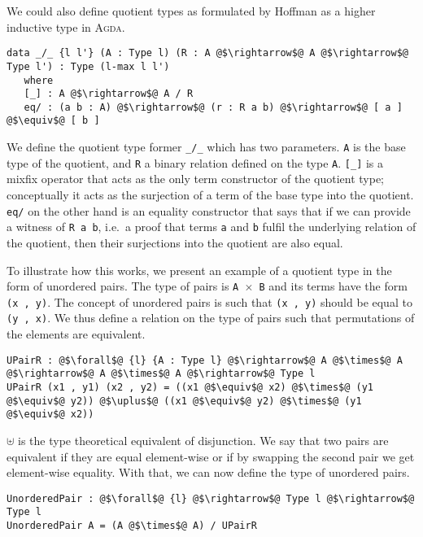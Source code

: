 \documentclass[12pt,twoside,maitrise]{dms}
\theoremstyle{definition}
\numberwithin{equation}{section}
\numberwithin{table}{chapter}
\numberwithin{figure}{chapter}
\newcommand\id[1] {\texttt{#1}}
\newcommand\fn[1] {\texttt{#1}}
\def\Agda{\textsc{Agda}\xspace}
\begin{document}
We could also define quotient types as formulated by
Hoffman\cite{hofmann1995extensional} as a higher inductive type in \Agda{}.

\begin{verbatim}
data _/_ {l l'} (A : Type l) (R : A @$\rightarrow$@ A @$\rightarrow$@ Type l') : Type (l-max l l')
   where
   [_] : A @$\rightarrow$@ A / R
   eq/ : (a b : A) @$\rightarrow$@ (r : R a b) @$\rightarrow$@ [ a ] @$\equiv$@ [ b ]
\end{verbatim}

We define the quotient type former \fn{\_/\_} which has two parameters. \id{A}
is the base type of the quotient, and \id{R} a binary relation defined on the
type \id{A}. \fn{[\_]} is a mixfix operator that acts as the only term
constructor of the quotient type; conceptually it acts as the surjection of a
term of the base type into the quotient. \fn{eq/} on the other hand is an
equality constructor that says that if we can provide a witness of \fn{R a b},
i.e.\ a proof that terms \id{a} and \id{b} fulfil the underlying relation of the
quotient, then their surjections into the quotient are also equal.

To illustrate how this works, we present an example of a quotient type in the
form of unordered pairs. The type of pairs is \fn{A $\times$ B} and its terms
have the form \fn{(x , y)}. The concept of unordered pairs is such that \fn{(x ,
  y)} should be equal to \fn{(y , x)}. We thus define a relation on the type of
pairs such that permutations of the elements are equivalent.

\begin{verbatim}
UPairR : @$\forall$@ {l} {A : Type l} @$\rightarrow$@ A @$\times$@ A @$\rightarrow$@ A @$\times$@ A @$\rightarrow$@ Type l
UPairR (x1 , y1) (x2 , y2) = ((x1 @$\equiv$@ x2) @$\times$@ (y1 @$\equiv$@ y2)) @$\uplus$@ ((x1 @$\equiv$@ y2) @$\times$@ (y1 @$\equiv$@ x2))
\end{verbatim}

$\uplus$ is the type theoretical equivalent of disjunction. We say that two
pairs are equivalent if they are equal element-wise or if by swapping the second
pair we get element-wise equality. With that, we can now define the type of
unordered pairs.

\begin{verbatim}
UnorderedPair : @$\forall$@ {l} @$\rightarrow$@ Type l @$\rightarrow$@ Type l
UnorderedPair A = (A @$\times$@ A) / UPairR
\end{verbatim}
\end{document}

